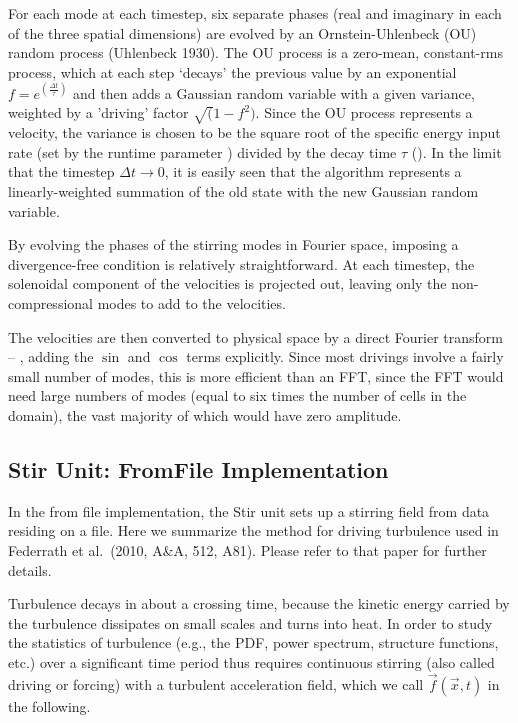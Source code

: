 For each mode at each timestep, six separate phases (real and
imaginary in each of the three spatial dimensions) are evolved by an
Ornstein-Uhlenbeck (OU) random process (Uhlenbeck 1930).   The OU process is a zero-mean,
constant-rms
process, which at each step `decays' the previous value by an exponential
$f = e^{(\frac{\Delta t}{\tau})}$ and then adds a Gaussian random variable with
a given variance, weighted by a 'driving' factor $\sqrt (1 - f^2)$.
Since the OU process represents a
velocity, the variance is chosen to be the square root of the specific
energy input rate (set by the runtime parameter )
divided by the decay time $\tau$ (). In the limit that the
timestep $\Delta t \rightarrow 0$, it is easily seen that the algorithm
represents a linearly-weighted summation of the old state with the new
Gaussian random variable.

By evolving the phases of the stirring modes in Fourier space, imposing
a divergence-free condition is relatively straightforward.  At each
timestep, the solenoidal component of the velocities is projected out,
leaving only the non-compressional modes to add to the velocities.

The velocities are then converted to physical space by a direct Fourier
transform -- \ie, adding the $\sin$ and $\cos$ terms explicitly.
Since most drivings involve a fairly small number of modes,
this is more efficient than an FFT, since the FFT would need large
numbers of modes (equal to six times the number of cells in the domain),
the vast majority of which would have zero amplitude.

\subsection{Stir Unit: FromFile Implementation}
\label{Sec:stirfromfile}

In the from file implementation, the Stir unit sets up a stirring field from data residing on a file.
Here we summarize the method for driving turbulence used in Federrath et al.~(2010, A\&A, 512, A81).
Please refer to that paper for further details.

Turbulence decays in about a crossing time, because the kinetic energy carried by the turbulence
dissipates on small scales and turns into heat. In order to study the statistics of turbulence
(e.g., the PDF, power spectrum, structure functions, etc.) over a significant time period thus
requires continuous stirring (also called driving or forcing) with a turbulent acceleration field,
which we call $\vec{f}(\vec{x},t)$ in the following.


